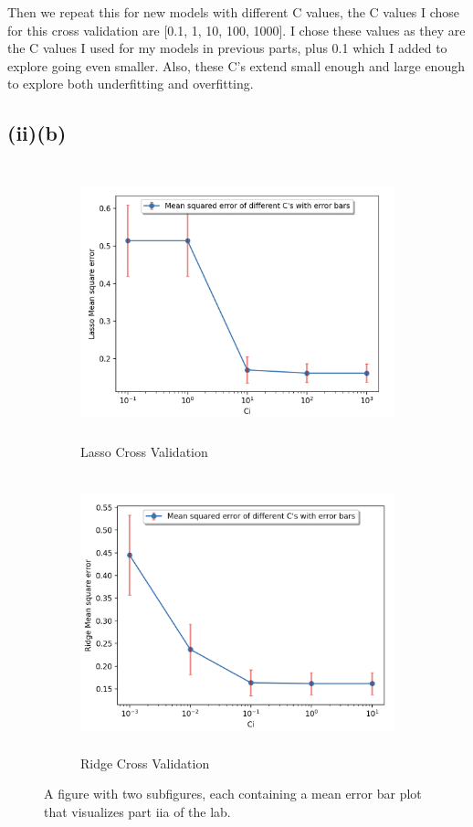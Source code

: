 \documentclass{article}
\begin{document}
Then we repeat this for new models with different C values, the C values I chose for this cross validation are [0.1, 1, 10, 100, 1000]. I chose these values as they are the C values I used for my models in previous parts, plus 0.1 which I added to explore going even smaller. Also, these C's extend small enough and large enough to explore both underfitting and overfitting.

\subsection{(ii)(b)}
\begin{figure}
\centering
\begin{subfigure}{.5\linewidth}
  \centering
  \includegraphics[width=\linewidth, height=8cm]{iia1.png}
  \caption{Lasso Cross Validation}
  \label{fig:sub1}
\end{subfigure}%
\begin{subfigure}{.5\textwidth}
  \centering
  \includegraphics[width=\linewidth, height=8cm]{iia2.png}
  \caption{Ridge Cross Validation}
  \label{fig:sub2}
\end{subfigure}
\caption{A figure with two subfigures, each containing a mean error bar plot that visualizes part iia of the lab.}
\label{fig:test}
\end{figure}
\end{document}
